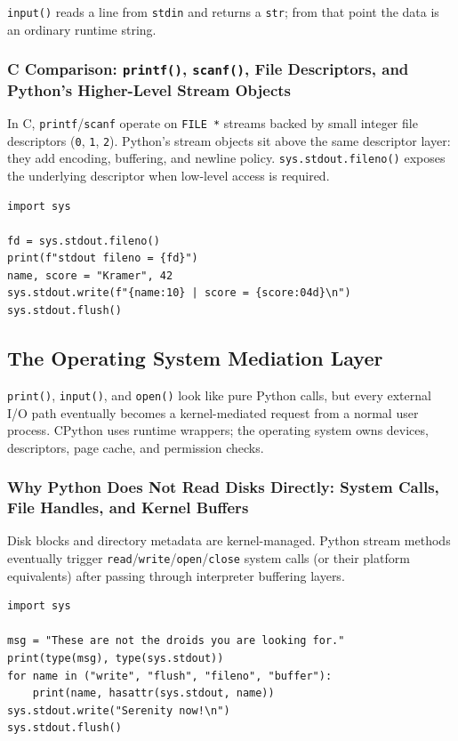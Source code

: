 \documentclass[a4paper,twoside]{report}
\begin{document}
\texttt{input()} reads a line from \texttt{stdin} and returns a \texttt{str}; from that point the data is an ordinary runtime string.

\subsubsection{C Comparison: \texttt{printf()}, \texttt{scanf()}, File Descriptors, and Python's Higher-Level Stream Objects}

In C, \texttt{printf}/\texttt{scanf} operate on \texttt{FILE *} streams backed by small integer file descriptors (\texttt{0}, \texttt{1}, \texttt{2}). Python's stream objects sit above the same descriptor layer: they add encoding, buffering, and newline policy. \texttt{sys.stdout.fileno()} exposes the underlying descriptor when low-level access is required.

\begin{verbatim}
import sys

fd = sys.stdout.fileno()
print(f"stdout fileno = {fd}")
name, score = "Kramer", 42
sys.stdout.write(f"{name:10} | score = {score:04d}\n")
sys.stdout.flush()
\end{verbatim}


\subsection{The Operating System Mediation Layer}

\texttt{print()}, \texttt{input()}, and \texttt{open()} look like pure Python calls, but every external I/O path eventually becomes a kernel-mediated request from a normal user process. CPython uses runtime wrappers; the operating system owns devices, descriptors, page cache, and permission checks.

\subsubsection{Why Python Does Not Read Disks Directly: System Calls, File Handles, and Kernel Buffers}

Disk blocks and directory metadata are kernel-managed. Python stream methods eventually trigger \texttt{read}/\texttt{write}/\texttt{open}/\texttt{close} system calls (or their platform equivalents) after passing through interpreter buffering layers.

\begin{verbatim}
import sys

msg = "These are not the droids you are looking for."
print(type(msg), type(sys.stdout))
for name in ("write", "flush", "fileno", "buffer"):
    print(name, hasattr(sys.stdout, name))
sys.stdout.write("Serenity now!\n")
sys.stdout.flush()
\end{verbatim}
\end{document}
